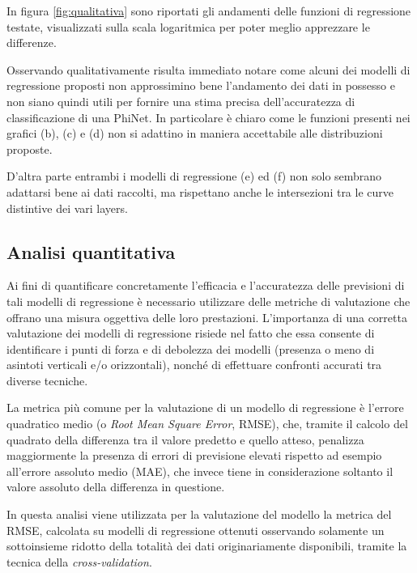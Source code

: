 In figura \ref{fig:qualitativa} sono riportati gli andamenti delle funzioni di regressione testate, visualizzati sulla scala logaritmica per poter meglio apprezzare le differenze. 

Osservando qualitativamente risulta immediato notare come alcuni dei modelli di regressione proposti non approssimino bene l'andamento dei dati in possesso e non siano quindi utili per fornire una stima precisa dell'accuratezza di classificazione di una PhiNet. In particolare è chiaro come le funzioni presenti nei grafici (b), (c) e (d) non si adattino in maniera accettabile alle distribuzioni proposte.

D'altra parte entrambi i modelli di regressione (e) ed (f) non solo sembrano adattarsi bene ai dati raccolti, ma rispettano anche le intersezioni tra le curve distintive dei vari layers.

\subsection{Analisi quantitativa}

Ai fini di quantificare concretamente l'efficacia e l'accuratezza delle previsioni di tali modelli di regressione è necessario utilizzare delle metriche di valutazione che offrano una misura oggettiva delle loro prestazioni.
L'importanza di una corretta valutazione dei modelli di regressione risiede nel fatto che essa consente di identificare i punti di forza e di debolezza dei modelli (presenza o meno di asintoti verticali e/o orizzontali), nonché di effettuare confronti accurati tra diverse tecniche.

La metrica più comune per la valutazione di un modello di regressione è l'errore quadratico medio (o \textit{Root Mean Square Error}, RMSE), che, tramite il calcolo del quadrato della differenza tra il valore predetto e quello atteso, penalizza maggiormente la presenza di errori di previsione elevati rispetto ad esempio all'errore assoluto medio (MAE), che invece tiene in considerazione soltanto il valore assoluto della differenza in questione.

In questa analisi viene utilizzata per la valutazione del modello la metrica del RMSE, calcolata su modelli di regressione ottenuti osservando solamente un sottoinsieme ridotto della totalità dei dati originariamente disponibili, tramite la tecnica della \textit{cross-validation}.

